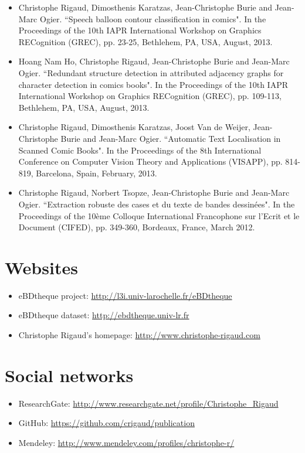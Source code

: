 \begin{itemize}
\item Christophe Rigaud, Dimosthenis Karatzas, Jean-Christophe Burie and Jean-Marc Ogier. ``Speech balloon contour classification in comics". In the Proceedings of the 10th IAPR International Workshop on Graphics RECognition (GREC), pp. 23-25, Bethlehem, PA, USA, August, 2013.
\vspace*{.3cm}

\item Hoang Nam Ho, Christophe Rigaud, Jean-Christophe Burie and Jean-Marc Ogier. ``Redundant structure detection in attributed adjacency graphs for character detection in comics books". In the Proceedings of the 10th IAPR International Workshop on Graphics RECognition (GREC), pp. 109-113, Bethlehem, PA, USA, August, 2013.
\vspace*{.3cm}

\item Christophe Rigaud, Dimosthenis Karatzas, Joost Van de Weijer, Jean-Christophe Burie and Jean-Marc Ogier. ``Automatic Text Localisation in Scanned Comic Books". In the Proceedings of the 8th International Conference on Computer Vision Theory and Applications (VISAPP), pp. 814-819, Barcelona, Spain, February, 2013.
\vspace*{.3cm}


\item Christophe Rigaud, Norbert Tsopze, Jean-Christophe Burie and Jean-Marc Ogier. ``Extraction robuste des cases et du texte de bandes dessin{\'e}es". In the Proceedings of the 10{\`e}me Colloque International Francophone sur l'Ecrit et le Document (CIFED), pp. 349-360, Bordeaux, France, March 2012.
\vspace*{.3cm}



\end{itemize}

\section*{Websites}

\begin{itemize}
	\item eBDtheque project: \url{http://l3i.univ-larochelle.fr/eBDtheque}
	\item eBDtheque dataset: \url{http://ebdtheque.univ-lr.fr}
	\item Christophe Rigaud's homepage: \url{http://www.christophe-rigaud.com}
\end{itemize}

\section*{Social networks}

\begin{itemize}
	\item ResearchGate: \url{http://www.researchgate.net/profile/Christophe_Rigaud}
	\item GitHub: \url{https://github.com/crigaud/publication}
	\item Mendeley: \url{http://www.mendeley.com/profiles/christophe-r/}
\end{itemize}

